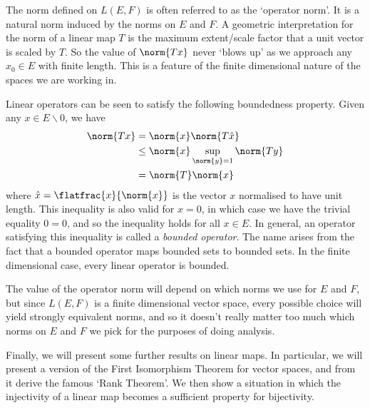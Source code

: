  The norm defined on \( L(E,F) \) is often referred to as the `operator norm'. It is a natural norm induced by the norms on \( E \) and \( F \). A geometric interpretation for the norm of a linear map \( T \) is the maximum extent/scale factor that a unit vector is scaled by \( T \). So the value of \( \norm{Tx} \) never `blows up' as we approach any \( x_0\in E \) with finite length. This is a feature of the finite dimensional nature of the spaces we are working in.

 \vspace{3mm}

 Linear operators can be seen to satisfy the following boundedness property. Given any \( x\in E\backslash\qty{0} \), we have
 \begin{align*}
   \norm{Tx}&= \norm{x}\norm{T\hat{x}}\\
   &\leq \norm{x}\sup_{\norm{y}=1}\norm{Ty}\\
   &= \norm{T}\norm{x}
 \end{align*}
 where \( \hat{x}=\flatfrac{x}{\norm{x}} \) is the vector \( x \) normalised to have unit length. This inequality is also valid for \( x=0 \), in which case we have the trivial equality \( 0=0 \), and so the inequality holds for all \( x\in E \). In general, an operator satisfying this inequality is called a \emph{bounded operator}. The name arises from the fact that a bounded operator maps bounded sets to bounded sets. In the finite dimensional case, every linear operator is bounded.

 \vspace{3mm}
 
 The value of the operator norm will depend on which norms we use for \( E \) and \( F \), but since \( L(E,F) \) is a finite dimensional vector space, every possible choice will yield strongly equivalent norms, and so it doesn't really matter too much which norms on \( E \) and \( F \) we pick for the purposes of doing analysis.

 \vspace{3mm}

 Finally, we will present some further results on linear maps. In particular, we will present a version of the First Isomorphism Theorem for vector spaces, and from it derive the famous `Rank Theorem'. We then show a situation in which the injectivity of a linear map becomes a sufficient property for bijectivity.

 \vspace{3mm}
 
